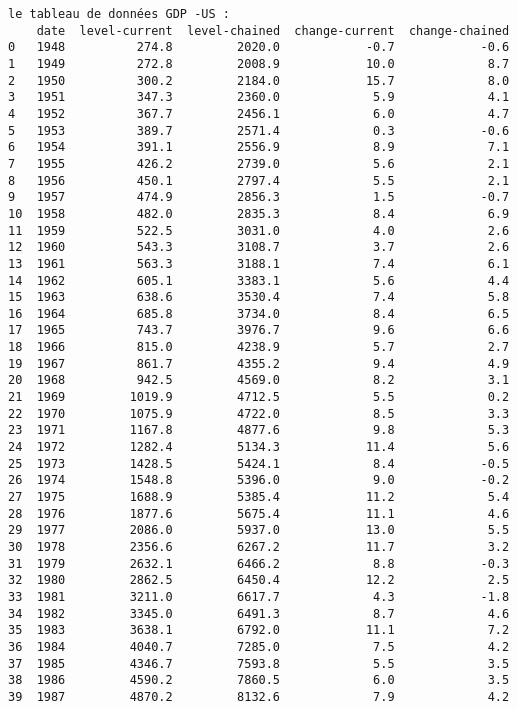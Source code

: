 \documentclass[11pt]{article}
\begin{document}
    \begin{Verbatim}[commandchars=\\\{\}]
le tableau de données GDP -US :
    date  level-current  level-chained  change-current  change-chained
0   1948          274.8         2020.0            -0.7            -0.6
1   1949          272.8         2008.9            10.0             8.7
2   1950          300.2         2184.0            15.7             8.0
3   1951          347.3         2360.0             5.9             4.1
4   1952          367.7         2456.1             6.0             4.7
5   1953          389.7         2571.4             0.3            -0.6
6   1954          391.1         2556.9             8.9             7.1
7   1955          426.2         2739.0             5.6             2.1
8   1956          450.1         2797.4             5.5             2.1
9   1957          474.9         2856.3             1.5            -0.7
10  1958          482.0         2835.3             8.4             6.9
11  1959          522.5         3031.0             4.0             2.6
12  1960          543.3         3108.7             3.7             2.6
13  1961          563.3         3188.1             7.4             6.1
14  1962          605.1         3383.1             5.6             4.4
15  1963          638.6         3530.4             7.4             5.8
16  1964          685.8         3734.0             8.4             6.5
17  1965          743.7         3976.7             9.6             6.6
18  1966          815.0         4238.9             5.7             2.7
19  1967          861.7         4355.2             9.4             4.9
20  1968          942.5         4569.0             8.2             3.1
21  1969         1019.9         4712.5             5.5             0.2
22  1970         1075.9         4722.0             8.5             3.3
23  1971         1167.8         4877.6             9.8             5.3
24  1972         1282.4         5134.3            11.4             5.6
25  1973         1428.5         5424.1             8.4            -0.5
26  1974         1548.8         5396.0             9.0            -0.2
27  1975         1688.9         5385.4            11.2             5.4
28  1976         1877.6         5675.4            11.1             4.6
29  1977         2086.0         5937.0            13.0             5.5
30  1978         2356.6         6267.2            11.7             3.2
31  1979         2632.1         6466.2             8.8            -0.3
32  1980         2862.5         6450.4            12.2             2.5
33  1981         3211.0         6617.7             4.3            -1.8
34  1982         3345.0         6491.3             8.7             4.6
35  1983         3638.1         6792.0            11.1             7.2
36  1984         4040.7         7285.0             7.5             4.2
37  1985         4346.7         7593.8             5.5             3.5
38  1986         4590.2         7860.5             6.0             3.5
39  1987         4870.2         8132.6             7.9             4.2
    \end{Verbatim}
\end{document}
